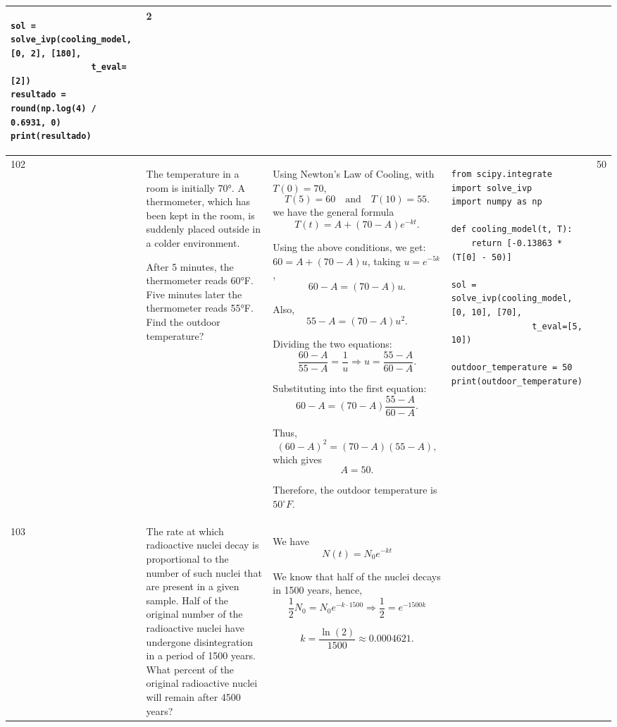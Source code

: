 \documentclass[a4paper,12pt]{article}
\begin{document}
\begin{longtable}{|p{0.3cm}|p{}|p{10cm}|p{}|p{1.5cm}|}
\begin{verbatim}
sol = solve_ivp(cooling_model, [0, 2], [180],
                t_eval=[2])
resultado = round(np.log(4) / 0.6931, 0)
print(resultado)
\end{verbatim}
& 2 \\ \hline

102 & The temperature in a room is initially 70°. A thermometer, which has been kept in the room, is suddenly placed outside in a colder environment.

After 5 minutes, the thermometer reads 60°F. Five minutes later the thermometer reads 55°F. Find the outdoor temperature? &
Using Newton’s Law of Cooling, with \(T(0)=70\),
\[T(5)=60 \quad \text{and} \quad T(10)=55.\]
we have the general formula
\[T(t)=A+(70-A)e^{-kt}.\]

Using the above conditions, we get:
$60=A+(70-A)u$, taking $u=e^{-5k}$,
\[
60-A=(70-A)u.
\]

Also,
\[
55-A=(70-A)u^2.
\]

Dividing the two equations:
\[
\frac{60-A}{55-A}=\frac{1}{u}
\Rightarrow u=\frac{55-A}{60-A}.
\]

Substituting into the first equation:
\[
60-A=(70-A)\frac{55-A}{60-A}.
\]

Thus,
\[
(60-A)^2=(70-A)(55-A),
\]
which gives
\[
A=50.
\]

Therefore, the outdoor temperature is \(50^\circ F\). &
\begin{verbatim}
from scipy.integrate import solve_ivp
import numpy as np

def cooling_model(t, T):
    return [-0.13863 * (T[0] - 50)]

sol = solve_ivp(cooling_model, [0, 10], [70],
                t_eval=[5, 10])

outdoor_temperature = 50
print(outdoor_temperature)
\end{verbatim}
& 50 \\ \hline

103 & The rate at which radioactive nuclei decay is proportional to the number of such nuclei that are present in a given sample. Half of the original number of the radioactive nuclei have undergone disintegration in a period of 1500 years. What percent of the original radioactive nuclei will remain after 4500 years? &
We have
\[
N(t)=N_0e^{-kt}
\]

We know that half of the nuclei decays in 1500 years, hence,
\[
\frac{1}{2}N_0=N_0e^{-k\cdot1500}
\Rightarrow \frac{1}{2}=e^{-1500k}
\]

\[
k=\frac{\ln(2)}{1500}\approx0.0004621.
\]


\end{longtable}
\end{document}
